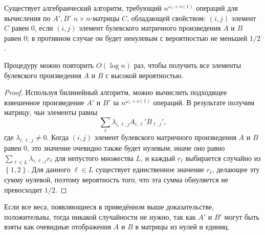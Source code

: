 \begin{theorem}
  \label{th:12:3.7} Существует алгебраический алгоритм, требующий $n^{\omega_s + o(1)}$ операций для вычисления по $A',B'$ $n \times n$-матрицы $C$, обладающей свойством: $(i,j)$ элемент $C$ равен $0$, если $(i,j)$ элемент булевского матричного произведения $A$ и $B$ равен $0$; в противном случае он будет ненулевым с вероятностью не меньшей $1/2$.
  
  Процедуру можно повторить $O(\log n)$ раз, чтобы получить все элементы булевского произведения $A$ и $B$ с высокой вероятностью.
\end{theorem}
\begin{proof}
  Используя билинейный алгоритм, можно вычислить подходящее взвешенное произведение $A'$ и $B'$ за $n^{\omega_s+o(1)}$ операций. В результате получим матрицу, чьи элементы равны
  \[
  	\sum_\ell \lambda_{i,\ell,j} A_{i,\ell}' B_{\ell,j}',
  \]
  где $\lambda_{i,\ell,j} \neq 0$. Когда $(i,j)$ элемент булевского матричного произведения $A$ и $B$ равен 0, это значение очевидно также будет нулевым; иначе оно равно $\sum_{\ell \in L} \lambda_{i,\ell,j} r_{\ell}$ для непустого множества $L$, и каждый $r_{\ell}$ выбирается случайно из $\left\{ 1,2 \right\}$. Для данного $\ell \in L$ существует единственное значение $r_{\ell}$, делающее эту сумму нулевой, поэтому вероятность того, что эта сумма обнуляется не превосходит $1/2$.
\end{proof}

Если все веса, появляющиеся в приведённом выше доказательстве, положительны, тогда никакой случайности не нужно, так как $A'$ и $B'$ могут быть взяты как очевидные отображения $A$ и $B$ в матрицы из нулей и единиц.


